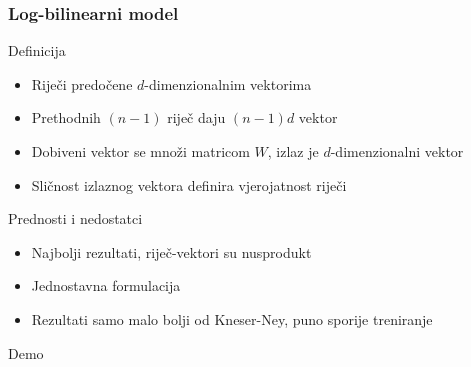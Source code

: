 \documentclass[utf8]{beamer}
\begin{document}
\begin{frame}
\frametitle{Log-bilinearni model}

	\begin{block}{Definicija}
	\begin{itemize}
		\item{Riječi predočene $d$-dimenzionalnim vektorima}
		\item{Prethodnih $(n - 1)$ riječ daju $(n - 1) d$ vektor}
		\item{Dobiveni vektor se množi matricom $W$, izlaz je $d$-dimenzionalni vektor}
		\item{Sličnost izlaznog vektora definira vjerojatnost riječi}
	\end{itemize}
	\end{block}

	\begin{block}{Prednosti i nedostatci}
	\begin{itemize}
		\item{Najbolji rezultati, riječ-vektori su nusprodukt}
		\item{Jednostavna formulacija}
		\item{Rezultati samo malo bolji od Kneser-Ney, puno sporije treniranje}
	\end{itemize}
	\end{block}

\end{frame}

\begin{frame}

	Demo
	
\end{frame}

\end{document}
